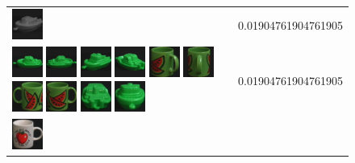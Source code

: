 \begin{figure}[tbp]
\begin{center}
\begin{tabular}{m{11cm} | m{3cm} |}
\includegraphics[width=1cm]{coil/beeld-29.eps}
& {\scriptsize 0.01904761904761905}
\\
\includegraphics[width=1cm]{coil/beeld-54.eps}
\includegraphics[width=1cm]{coil/beeld-55.eps}
\includegraphics[width=1cm]{coil/beeld-57.eps}
\includegraphics[width=1cm]{coil/beeld-58.eps}
\includegraphics[width=1cm]{coil/beeld-34.eps}
\includegraphics[width=1cm]{coil/beeld-35.eps}
\includegraphics[width=1cm]{coil/beeld-31.eps}
\includegraphics[width=1cm]{coil/beeld-30.eps}
\includegraphics[width=1cm]{coil/beeld-59.eps}
\includegraphics[width=1cm]{coil/beeld-56.eps}
& {\scriptsize 0.01904761904761905}
\\
\includegraphics[width=1cm]{coil/beeld-36.eps}

\end{tabular}
\end{center}
\end{figure}
